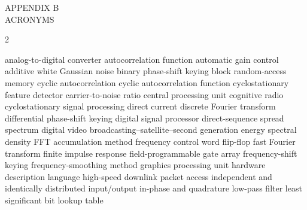 \newpage
{}

\begin{center}
  APPENDIX B\\
  ACRONYMS
\end{center}
\bigskip

\begin{center}
\begin{multicols}{2}
\begin{acronym}[CubeMATLABSat]
     {analog-to-digital converter}
     {autocorrelation function}
     {automatic gain control}
    {additive white Gaussian noise}
    {binary phase-shift keying}
    {block random-access memory}
     {cyclic autocorrelation}
     {cyclic autocorrelation function}
     {cyclostationary feature detector}
     {carrier-to-noise ratio}
     {central processing unit}
      {cognitive radio}
     {cyclostationary signal processing}
      {direct current}
     {discrete Fourier transform}
    {differential phase-shift keying}
     {digital signal processor}
    {direct-sequence spread spectrum}
  {digital video broadcasting--satellite--second generation}
     {energy spectral density}
     {FFT accumulation method}
     {frequency control word}
      {flip-flop}
     {fast Fourier transform}
     {finite impulse response}
    {field-programmable gate array}
     {frequency-shift keying}
     {frequency-smoothing method}
     {graphics processing unit}
     {hardware description language}
   {high-speed downlink packet access}
     {independent and identically distributed}
      {input/output}
      {in-phase and quadrature}
     {low-pass filter}
     {least significant bit}
     {lookup table}

\end{acronym}
\end{multicols}
\end{center}
